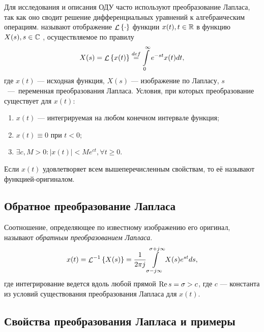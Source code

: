 \documentclass[../../TAU.tex]{subfiles}
\begin{document}
    Для исследования и описания ОДУ часто используют преобразование Лапласа, так как оно сводит решение дифференциальных уравнений к алгебраическим операциям.
     называют отображение 
    $\mathop{\mathcal{L}}\nolimits\left\{\cdot\right\}$ 
    функции 
    $x(t), t\in\mathbb{R}$
     в функцию 
    $X(s), s\in\mathbb{C}$
    , осуществляемое по правилу
    \begin{equation}
        X(s) = \mathop{\mathcal{L}}\nolimits\left\{x(t)\right\} \stackrel{def}{=} \int\limits_0^\infty e^{-st} x(t) dt,
    \end{equation}
    где $x(t)$ --- исходная функция, $X(s)$ --- изображение по Лапласу, $s$~---~переменная преобразования Лапласа.
    Условия, при которых преобразование существует для $x(t)$:
    \begin{enumerate}
        \item $x(t)$ --- интегрируемая на любом конечном интервале функция;
        \item $x(t)\equiv0$ при $t < 0$;
        \item $\exists c, M > 0: |x(t)| < M e^{ct}, \forall t \ge 0$.
    \end{enumerate}
    Если $x(t)$ удовлетворяет всем вышеперечисленным свойствам, то её называют функцией-оригиналом.

\subsection{Обратное преобразование Лапласа}

    Соотношение, определяющее по известному изображению его оригинал, называют {\it обратным преобразованием Лапласа}. 
    \begin{equation}
        x(t) = {\mathop{\mathcal{L}}\nolimits^{-1}\left\{X(s)\right\}} = \frac{1}{2\pi j} \int\limits_{\sigma-j\infty}^{\sigma + j\infty} X(s)e^{st} ds,
    \end{equation}
    где интегрирование ведется вдоль любой прямой 
    $\mathop{\mathrm{Re}}\nolimits{s} = \sigma > c$, 
    где $c$ --- константа из условий существования преобразования Лапласа для $x(t)$.

\subsection{Свойства преобразования Лапласа и примеры} 
\end{document}
